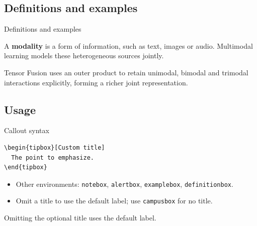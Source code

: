 \subsection{Definitions and examples}
\begin{frame}{Definitions and examples}
  \begin{definitionbox}[Definition]
    A \textbf{modality} is a form of information, such as text, images or audio.
    Multimodal learning models these heterogeneous sources jointly.
  \end{definitionbox}
  \begin{examplebox}[Example]
    Tensor Fusion uses an outer product to retain unimodal, bimodal and trimodal interactions explicitly, forming a richer joint representation.
  \end{examplebox}
\end{frame}

\subsection{Usage}
\begin{frame}[fragile]{Callout syntax}
  \begin{verbatim}
\begin{tipbox}[Custom title]
  The point to emphasize.
\end{tipbox}
  \end{verbatim}
  \begin{itemize}
    \item Other environments: \texttt{notebox}, \texttt{alertbox}, \texttt{examplebox}, \texttt{definitionbox}.
    \item Omit a title to use the default label; use \texttt{campusbox} for no title.
  \end{itemize}
  \begin{tipbox}
    Omitting the optional title uses the default label.
  \end{tipbox}
\end{frame}


